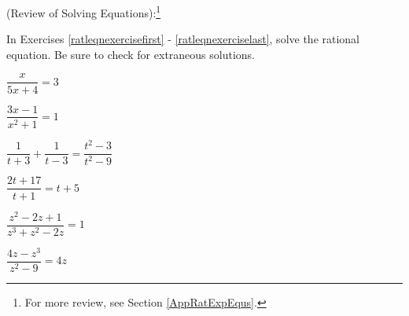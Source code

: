 \documentclass{ximera}
\begin{document}
	\author{Stitz-Zeager}


\begin{question}
(Review of Solving Equations):\footnote{For more review, see Section \ref{AppRatExpEqus}.} 

In Exercises \ref{ratleqnexercisefirst} - \ref{ratleqnexerciselast},  solve the rational equation.  Be sure to check for extraneous solutions.

\begin{problem}\label{ratleqnexercisefirst}
$\dfrac{x}{5x + 4} = 3$ 
\end{problem}

\begin{problem}
$\dfrac{3x - 1}{x^{2} + 1} = 1$ 
\end{problem} 

\begin{problem}
$\dfrac{1}{t + 3} + \dfrac{1}{t - 3} = \dfrac{t^{2} - 3}{t^{2} - 9}$ 
\end{problem} 

\begin{problem}
$\dfrac{2t + 17}{t + 1} = t + 5$ 
\end{problem}  

\begin{problem}
$\dfrac{z^{2} - 2z + 1}{z^{3} + z^{2} - 2z} = 1$ 
\end{problem}   

\begin{problem}\label{ratleqnexerciselast}
$\dfrac{4z- z^3}{z^{2} - 9} = 4z$  
\end{problem}  

\end{question}
\end{document}
